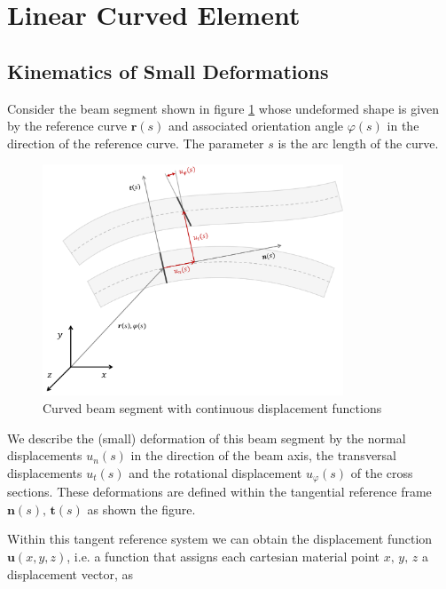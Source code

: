 \newpage
\section{Linear Curved Element}

\subsection*{Kinematics of Small Deformations}

Consider the beam segment shown in figure \ref{fig:linear-curved-beam-sections} whose undeformed shape is given by the reference curve $\boldsymbol{r}(s)$ and associated orientation angle $\varphi(s)$ in the direction of the reference curve.
The parameter $s$ is the arc length of the curve.

\begin{figure}[h]
\centering
\includegraphics[width=0.8\textwidth]{figures/elements/linear-curved-beam-sections.pdf}
\caption{Curved beam segment with continuous displacement functions}
\label{fig:linear-curved-beam-sections}
\end{figure}

We describe the (small) deformation of this beam segment by the normal displacements $u_n(s)$ in the direction of the beam axis, the transversal displacements $u_t(s)$ and the rotational displacement $u_\varphi(s)$ of the cross sections.
These deformations are defined within the tangential reference frame $\boldsymbol{n}(s),\,\boldsymbol{t}(s)$ as shown the figure.

Within this tangent reference system we can obtain the displacement function $\boldsymbol{u}(x,y,z)$, i.e. a function that assigns each cartesian material point $x,\,y,\,z$ a displacement vector, as

